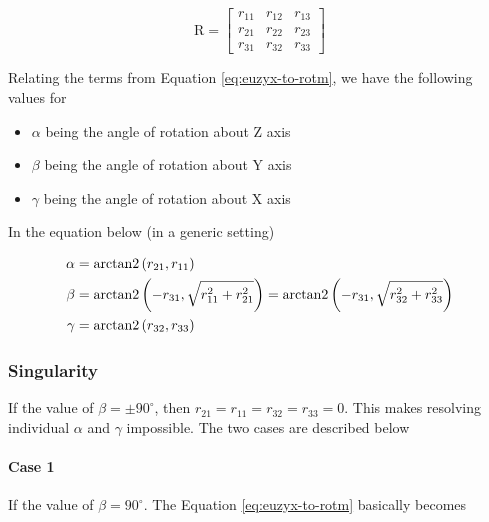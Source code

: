 \begin{equation}
    \mathrm{R} = \begin{bmatrix}
        r_{11} & r_{12} & r_{13} \\
        r_{21} & r_{22} & r_{23} \\
        r_{31} & r_{32} & r_{33}
        \end{bmatrix}
    \nonumber
\end{equation}

Relating the terms from Equation \ref{eq:euzyx-to-rotm}, we have the following values for 

\begin{itemize}
    \item $\alpha$ being the angle of rotation about Z axis
    \item $\beta$ being the angle of rotation about Y axis
    \item $\gamma$ being the angle of rotation about X axis
\end{itemize}

In the equation below (in a generic setting)

\begin{equation}
    \begin{split}
        \alpha &= \textup{arctan2} \left ( r_{21}, r_{11} \right ) \\
        \beta &= \textup{arctan2} \left ( -r_{31}, \sqrt{r_{11}^2 + r_{21}^2} \right ) = \textup{arctan2} \left ( -r_{31}, \sqrt{r_{32}^2 + r_{33}^2} \right ) \\
        \gamma &= \textup{arctan2} \left ( r_{32}, r_{33} \right )
    \end{split}
    \label{eq:rotm-to-euzyx-norm}
\end{equation}

\subsubsection*{Singularity}

If the value of $\beta = \pm 90^{\circ}$, then $r_{21} = r_{11} = r_{32} = r_{33} = 0$. This makes resolving individual $\alpha$ and $\gamma$ impossible. The two cases are described below

\paragraph*{Case 1}
If the value of $\beta = 90^{\circ}$. The Equation \ref{eq:euzyx-to-rotm} basically becomes

